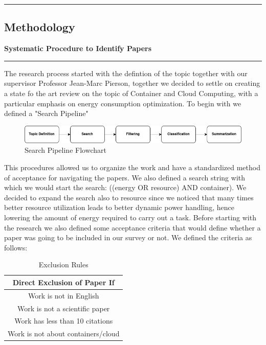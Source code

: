 {\color{gray}\hrule}
\begin{center}
\section{Methodology}
\textbf{Systematic Procedure to Identify Papers}
\bigskip
\end{center}
{\color{gray}\hrule}
\begin{multicols}{2}
The research process started with the defintion of the topic together with our supervisor Professor Jean-Marc Pierson, together we decided to settle on creating a state fo the art review on the topic of Container and Cloud Computing, with a particular emphasis on energy consumption optimization. 
To begin with we defined a "Search Pipeline"


\begin{figure}[H]
    \centering
    \includegraphics[width=\columnwidth]{flowchartTIR.png}
    \caption{Search Pipeline Flowchart}
    \label{fig:search_pipeline}
\end{figure}

This procedures allowed us to organize the work and have a standardized method of acceptance for navigating the papers. 
We also defined a search string with which we would start the search: ((energy OR resource) AND container).
We decided to expand the search also to resource since we noticed that many times better resource utilization leads to better dynamic power handling, hence lowering the amount of energy required to carry out a task.
Before starting with the research we also defined some acceptance criteria that would define whether a paper was going to be included in our survey or not. We defined the criteria as follows:



\begin{table}[H]
\centering
\begin{tabular}{c}
\hline
Direct Exclusion of Paper If \\ \hline
Work is not in English \\ 
Work is not a scientific paper \\ 
Work has less than 10 citations \\ 
Work is not about containers/cloud \\ \hline
\end{tabular}
    \caption{Exclusion Rules}
    \label{tab:Exclusion Rules}
\end{table}


\end{multicols}
